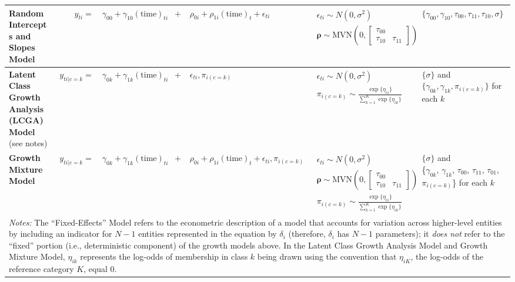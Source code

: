 \begin{table*}[!h]
\begin{tabular}{p{1.1in}rrcllp{1in}}
\raggedright\textbf{Random Intercepts and Slopes Model} & 
    $y_{ti} =$&
    $\gamma_{00} + \gamma_{10}(\text{time})_{ti} $&$+$&
    $\rho_{0i}  + \rho_{1i}(\text{time})_{t} + \epsilon_{ti}$ &
    $\begin{array}{l}\epsilon_{ti} \sim N(0, \sigma^2) \\ \mathbf{\rho} \sim \text{MVN}\left(0, \begin{bmatrix}\tau_{00} & \\ \tau_{10} & \tau_{11}\end{bmatrix}\right)\end{array}$ &
    $\{\gamma_{00}, \gamma_{10}, \tau_{00}, \tau_{11}, \tau_{10}, \sigma\}$ \\\midrule

\raggedright\textbf{Latent Class Growth Analysis (LCGA) Model} (see notes)&
    $y_{ti|c=k} =$&
    $\gamma_{0k} + \gamma_{1k}(\text{time})_{ti}$ &+&
    $\epsilon_{ti}, \pi_{i(c=k)}$ & 
    $\begin{array}{l}\epsilon_{ti} \sim N(0, \sigma^2) \\ \pi_{i(c=k)} \sim \frac{\exp\{\eta_{ci}\}}{\sum^K_{k=1}\exp\{\eta_{ik}\}}\end{array}$ &
    \multicolumn{1}{l}{\parbox[c]{1.75in}{\raggedright$\{\sigma\}$ and \\ $\{\gamma_{0k}, \gamma_{1k}, \pi_{i(c=k)}\}$ for each $k$}}\\\midrule

\raggedright\textbf{Growth Mixture Model}&
    $y_{ti|c=k} =$&
    $\gamma_{0k} + \gamma_{1k}(\text{time})_{ti}$ &+&
    $\rho_{0i}  + \rho_{1i}(\text{time})_{t} + \epsilon_{ti}, \pi_{i(c=k)}$ & 
    $\begin{array}{l}\epsilon_{ti} \sim N(0, \sigma^2) \\ \mathbf{\rho} \sim \text{MVN}\left(0, \begin{bmatrix}\tau_{00} & \\ \tau_{10} & \tau_{11}\end{bmatrix}\right)\\ \pi_{i(c=k)} \sim \frac{\exp\{\eta_{ci}\}}{\sum^K_{k=1}\exp\{\eta_{ik}\}}\end{array}$ &
    \multicolumn{1}{l}{\parbox[c]{1.75in}{\raggedright$\{\sigma\}$ and \\ \{$\gamma_{0k}$, $\gamma_{1k}$, $\tau_{00}$, $\tau_{11}$, $\tau_{01}$, $\pi_{i(c=k)}$\} for each $k$}}\\\bottomrule


\multicolumn{7}{p{\textwidth}}{\footnotesize
    \emph{Notes:} The ``Fixed-Effects'' Model refers to the econometric description of a model that accounts for variation across higher-level entities by including an indicator for $N{-}1$ entities represented in the equation by $\delta_i$ (therefore, $\delta_i$ has $N{-}1$ parameters); it \emph{does not} refer to the ``fixed'' portion (i.e., deterministic component) of the growth models above. In the Latent Class Growth Analysis Model and Growth Mixture Model, $\eta_{ik}$ represents the log-odds of membership in class $k$ being drawn using the convention that $\eta_{iK}$, the log-odds of the reference category $K$, equal 0.
}
\end{tabular}
\end{table*}
